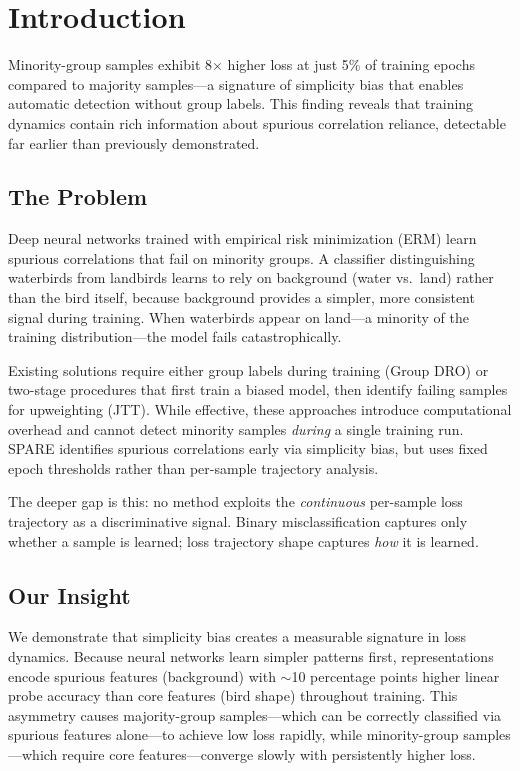 \section{Introduction}

Minority-group samples exhibit 8$\times$ higher loss at just 5\% of training epochs compared to majority samples---a signature of simplicity bias that enables automatic detection without group labels. This finding reveals that training dynamics contain rich information about spurious correlation reliance, detectable far earlier than previously demonstrated.

\subsection{The Problem}

Deep neural networks trained with empirical risk minimization (ERM) learn spurious correlations that fail on minority groups. A classifier distinguishing waterbirds from landbirds learns to rely on background (water vs.\ land) rather than the bird itself, because background provides a simpler, more consistent signal during training. When waterbirds appear on land---a minority of the training distribution---the model fails catastrophically.

Existing solutions require either group labels during training (Group DRO) or two-stage procedures that first train a biased model, then identify failing samples for upweighting (JTT). While effective, these approaches introduce computational overhead and cannot detect minority samples \emph{during} a single training run. SPARE identifies spurious correlations early via simplicity bias, but uses fixed epoch thresholds rather than per-sample trajectory analysis.

The deeper gap is this: no method exploits the \emph{continuous} per-sample loss trajectory as a discriminative signal. Binary misclassification captures only whether a sample is learned; loss trajectory shape captures \emph{how} it is learned.

\subsection{Our Insight}

We demonstrate that simplicity bias creates a measurable signature in loss dynamics. Because neural networks learn simpler patterns first, representations encode spurious features (background) with $\sim$10 percentage points higher linear probe accuracy than core features (bird shape) throughout training. This asymmetry causes majority-group samples---which can be correctly classified via spurious features alone---to achieve low loss rapidly, while minority-group samples---which require core features---converge slowly with persistently higher loss.

